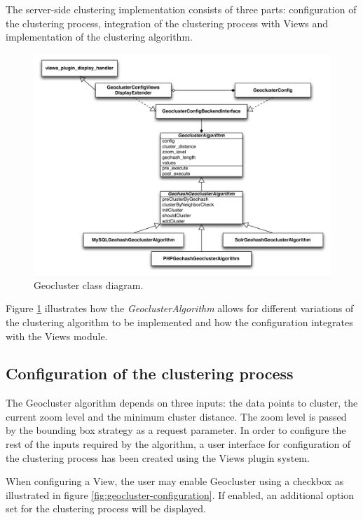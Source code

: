 The server-side clustering implementation consists of three parts: configuration of the clustering process, integration of the clustering process with Views and implementation of the clustering algorithm.

\begin{figure}[h]
  \begin{center}
    \includegraphics[width=1\textwidth]{figures/geocluster_class_diagram.pdf}
    \caption{Geocluster class diagram.}
    \label{fig:geocluster-class-diagram}
  \end{center}
\end{figure}

Figure \ref{fig:geocluster-class-diagram} illustrates how the \textit{GeoclusterAlgorithm} allows for different variations of the clustering algorithm to be implemented and how the configuration integrates with the Views module. 


\subsection{Configuration of the clustering process}

The Geocluster algorithm depends on three inputs: the data points to cluster, the current zoom level and the minimum cluster distance. The zoom level is passed by the bounding box strategy as a request parameter. In order to configure the rest of the inputs required by the algorithm, a user interface for configuration of the clustering process has been created using the Views plugin system.

When configuring a View, the user may enable Geocluster using a checkbox as illustrated in figure \ref{fig:geocluster-configuration}. If enabled, an additional option set for the clustering process will be displayed.

